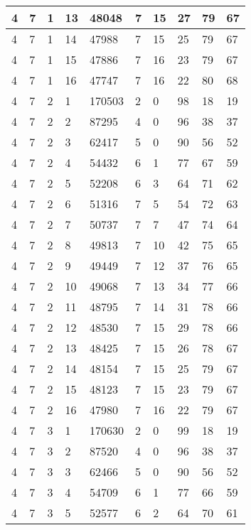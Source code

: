 \begin{table}[!ht]
\begin{tabular}{|l|l|l|l|l|l|l|l|l|l|}
        4 & 7 & 1 & 13 & 48048 & 7 & 15 & 27 & 79 & 67 \\ \hline
        4 & 7 & 1 & 14 & 47988 & 7 & 15 & 25 & 79 & 67 \\ \hline
        4 & 7 & 1 & 15 & 47886 & 7 & 16 & 23 & 79 & 67 \\ \hline
        4 & 7 & 1 & 16 & 47747 & 7 & 16 & 22 & 80 & 68 \\ \hline
        4 & 7 & 2 & 1 & 170503 & 2 & 0 & 98 & 18 & 19 \\ \hline
        4 & 7 & 2 & 2 & 87295 & 4 & 0 & 96 & 38 & 37 \\ \hline
        4 & 7 & 2 & 3 & 62417 & 5 & 0 & 90 & 56 & 52 \\ \hline
        4 & 7 & 2 & 4 & 54432 & 6 & 1 & 77 & 67 & 59 \\ \hline
        4 & 7 & 2 & 5 & 52208 & 6 & 3 & 64 & 71 & 62 \\ \hline
        4 & 7 & 2 & 6 & 51316 & 7 & 5 & 54 & 72 & 63 \\ \hline
        4 & 7 & 2 & 7 & 50737 & 7 & 7 & 47 & 74 & 64 \\ \hline
        4 & 7 & 2 & 8 & 49813 & 7 & 10 & 42 & 75 & 65 \\ \hline
        4 & 7 & 2 & 9 & 49449 & 7 & 12 & 37 & 76 & 65 \\ \hline
        4 & 7 & 2 & 10 & 49068 & 7 & 13 & 34 & 77 & 66 \\ \hline
        4 & 7 & 2 & 11 & 48795 & 7 & 14 & 31 & 78 & 66 \\ \hline
        4 & 7 & 2 & 12 & 48530 & 7 & 15 & 29 & 78 & 66 \\ \hline
        4 & 7 & 2 & 13 & 48425 & 7 & 15 & 26 & 78 & 67 \\ \hline
        4 & 7 & 2 & 14 & 48154 & 7 & 15 & 25 & 79 & 67 \\ \hline
        4 & 7 & 2 & 15 & 48123 & 7 & 15 & 23 & 79 & 67 \\ \hline
        4 & 7 & 2 & 16 & 47980 & 7 & 16 & 22 & 79 & 67 \\ \hline
        4 & 7 & 3 & 1 & 170630 & 2 & 0 & 99 & 18 & 19 \\ \hline
        4 & 7 & 3 & 2 & 87520 & 4 & 0 & 96 & 38 & 37 \\ \hline
        4 & 7 & 3 & 3 & 62466 & 5 & 0 & 90 & 56 & 52 \\ \hline
        4 & 7 & 3 & 4 & 54709 & 6 & 1 & 77 & 66 & 59 \\ \hline
        4 & 7 & 3 & 5 & 52577 & 6 & 2 & 64 & 70 & 61 \\ \hline

\end{tabular}
\end{table}
